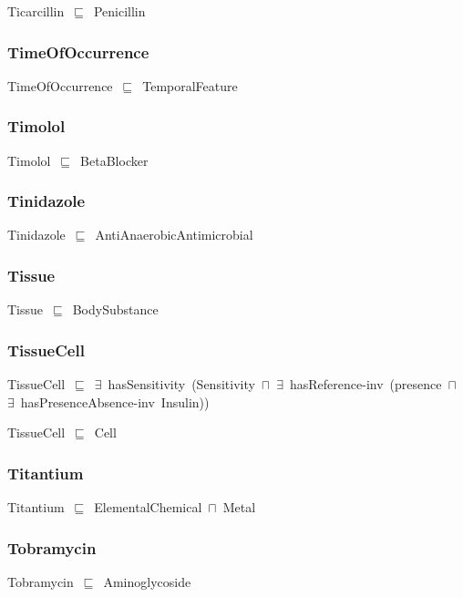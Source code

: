 \documentclass{article}
\begin{document}
Ticarcillin~\ensuremath{\sqsubseteq}~Penicillin~

\subsubsection*{TimeOfOccurrence}

TimeOfOccurrence~\ensuremath{\sqsubseteq}~TemporalFeature~

\subsubsection*{Timolol}

Timolol~\ensuremath{\sqsubseteq}~BetaBlocker~

\subsubsection*{Tinidazole}

Tinidazole~\ensuremath{\sqsubseteq}~AntiAnaerobicAntimicrobial~

\subsubsection*{Tissue}

Tissue~\ensuremath{\sqsubseteq}~BodySubstance~

\subsubsection*{TissueCell}

TissueCell~\ensuremath{\sqsubseteq}~\ensuremath{\exists}~hasSensitivity~(Sensitivity~\ensuremath{\sqcap}~\ensuremath{\exists}~hasReference-inv~(presence~\ensuremath{\sqcap}~\ensuremath{\exists}~hasPresenceAbsence-inv~Insulin))~

TissueCell~\ensuremath{\sqsubseteq}~Cell~

\subsubsection*{Titantium}

Titantium~\ensuremath{\sqsubseteq}~ElementalChemical~\ensuremath{\sqcap}~Metal~

\subsubsection*{Tobramycin}

Tobramycin~\ensuremath{\sqsubseteq}~Aminoglycoside~
\end{document}
